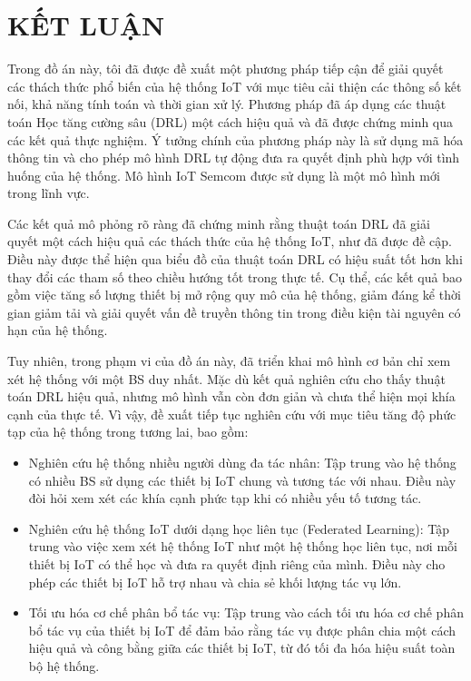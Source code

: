 \documentclass{article} %
\begin{document}
\newpage
\section*{KẾT LUẬN}

Trong đồ án này, tôi đã được đề xuất một phương pháp tiếp cận để giải quyết các thách thức phổ biến của hệ thống IoT với mục tiêu cải thiện các thông số kết nối, khả năng tính toán và thời gian xử lý. Phương pháp đã áp dụng các thuật toán Học tăng cường sâu (DRL) một cách hiệu quả và đã được chứng minh qua các kết quả thực nghiệm. Ý tưởng chính của phương pháp này là sử dụng mã hóa thông tin và cho phép mô hình DRL tự động đưa ra quyết định phù hợp với tình huống của hệ thống. Mô hình IoT Semcom được sử dụng là một mô hình mới trong lĩnh vực.

Các kết quả mô phỏng rõ ràng đã chứng minh rằng thuật toán DRL đã giải quyết một cách hiệu quả các thách thức của hệ thống IoT, như đã được đề cập. Điều này được thể hiện qua biểu đồ của thuật toán DRL có hiệu suất tốt hơn khi thay đổi các tham số theo chiều hướng tốt trong thực tế. Cụ thể, các kết quả bao gồm việc tăng số lượng thiết bị mở rộng quy mô của hệ thống, giảm đáng kể thời gian giảm tải và giải quyết vấn đề truyền thông tin trong điều kiện tài nguyên có hạn của hệ thống.

Tuy nhiên, trong phạm vi của đồ án này, đã triển khai mô hình cơ bản chỉ xem xét hệ thống với một BS duy nhất. Mặc dù kết quả nghiên cứu cho thấy thuật toán DRL hiệu quả, nhưng mô hình vẫn còn đơn giản và chưa thể hiện mọi khía cạnh của thực tế. Vì vậy, đề xuất tiếp tục nghiên cứu với mục tiêu tăng độ phức tạp của hệ thống trong tương lai, bao gồm:

\begin{itemize}
    \item Nghiên cứu hệ thống nhiều người dùng đa tác nhân: Tập trung vào hệ thống có nhiều BS sử dụng các thiết bị IoT chung và tương tác với nhau. Điều này đòi hỏi xem xét các khía cạnh phức tạp khi có nhiều yếu tố tương tác.
    \item Nghiên cứu hệ thống IoT dưới dạng học liên tục (Federated Learning): Tập trung vào việc xem xét hệ thống IoT như một hệ thống học liên tục, nơi mỗi thiết bị IoT có thể học và đưa ra quyết định riêng của mình. Điều này cho phép các thiết bị IoT hỗ trợ nhau và chia sẻ khối lượng tác vụ lớn.
    \item Tối ưu hóa cơ chế phân bổ tác vụ: Tập trung vào cách tối ưu hóa cơ chế phân bổ tác vụ của thiết bị IoT để đảm bảo rằng tác vụ được phân chia một cách hiệu quả và công bằng giữa các thiết bị IoT, từ đó tối đa hóa hiệu suất toàn bộ hệ thống.
\end{itemize}
\end{document}

